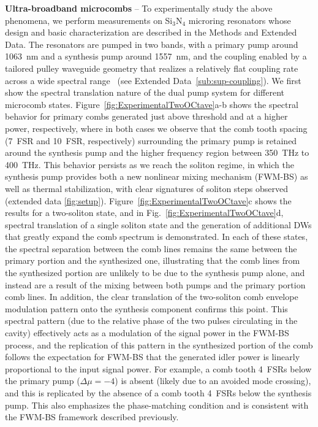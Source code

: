 \documentclass[reprint,superscriptaddress, amsmath,amssymb,pra, aps,floatfix,longbibliography]{revtex4-1}
\begin{document}
\noindent \textbf{Ultra-broadband microcombs} -- To experimentally study the above phenomena, we perform measurements on Si$_3$N$_4$ microring resonators whose design and basic characterization are described in the Methods and Extended Data. The resonators are pumped in two bands, with a primary pump around 1063~nm and a synthesis pump around 1557~nm, and the coupling enabled by a tailored pulley waveguide geometry that realizes a relatively flat coupling rate across a wide spectral range~\cite{moille_broadband_2019} (see Extended Data~\cref{sub:sup-coupling}). We first show the spectral translation nature of the dual pump system for different microcomb states. Figure~\ref{fig:ExperimentalTwoOCtave}a-b shows the spectral behavior for primary combs generated just above threshold and at a higher power, respectively, where in both cases we observe that the comb tooth spacing (7~FSR and 10~FSR, respectively) surrounding the primary pump is retained around the synthesis pump and the higher frequency region between 350~THz to 400~THz. This behavior persists as we reach the soliton regime, in which the synthesis pump provides both a new nonlinear mixing mechanism (FWM-BS) as well as thermal stabilization, with clear signatures of soliton steps observed (extended data \cref{fig:setup}). Figure~\ref{fig:ExperimentalTwoOCtave}c shows the results for a two-soliton state, and in Fig.~\ref{fig:ExperimentalTwoOCtave}d, spectral translation of a single soliton state and the generation of additional DWs that greatly expand the comb spectrum is demonstrated. In each of these states, the spectral separation between the comb lines remains the same between the primary portion and the synthesized one, illustrating that the comb lines from the synthesized portion are unlikely to be due to the synthesis pump alone, and instead are a result of the mixing between both pumps and the primary portion comb lines. In addition, the clear translation of the two-soliton comb envelope modulation pattern onto the synthesis component confirms this point. This spectral pattern (due to the relative phase of the two pulses circulating in the cavity) effectively acts as a modulation of the signal power in the FWM-BS process, and the replication of this pattern in the synthesized portion of the comb follows the expectation for FWM-BS that the generated idler power is linearly proportional to the input signal power. For example, a comb tooth 4~FSRs below the primary pump ($\Delta\mu=-4$) is absent (likely due to an avoided mode crossing), and this is replicated by the absence of a comb tooth 4~FSRs below the synthesis pump. This also emphasizes the phase-matching condition and is consistent with the FWM-BS framework described previously.
\end{document}
